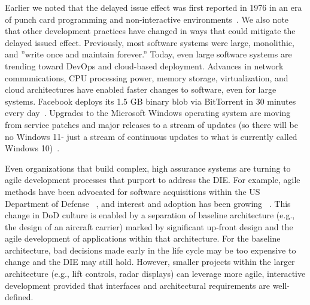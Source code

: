 \documentclass[smallcondensed]{svjour3}
\begin{document}
Earlier we noted that the delayed issue effect was first reported in 1976 in an era of punch card programming and non-interactive environments~\cite{Boehm76}. We also note that other development practices have changed in ways that could   mitigate the delayed issued effect.  Previously,
most software systems were large, monolithic, and ''write once and maintain
forever.'' Today, even large software systems are trending toward DevOps and cloud-based deployment. Advances in network communications, CPU processing power, memory storage, virtualization, and cloud architectures have enabled faster changes to software, even for large systems. Facebook deploys its 1.5 GB binary blob via BitTorrent in 30 minutes every day~\cite{Facebook}. 
Upgrades to the Microsoft Windows operating system are moving from service patches and major releases to a stream of updates (so there will be no Windows 11- just a stream of continuous updates to what is currently called Windows 10)~\cite{bright15}.


Even organizations that build complex, high assurance systems are turning to agile development processes that purport to address the DIE. For example, agile methods have been advocated for software acquisitions within the US Department of Defense ~\cite{kim13}, and interest and adoption has been growing ~\cite{lapham11}. 
This change in DoD culture is enabled by a separation of baseline architecture
(e.g., the design of an 
aircraft carrier) marked by significant up-front design and the agile development of applications within that architecture.
For the baseline architecture, bad decisions
made early in the life cycle may be too expensive to change and the DIE may still hold.
However, smaller projects within the larger architecture (e.g., lift controls, radar displays) can leverage more agile, interactive development provided that interfaces and architectural requirements are well-defined. 
 
\end{document}
